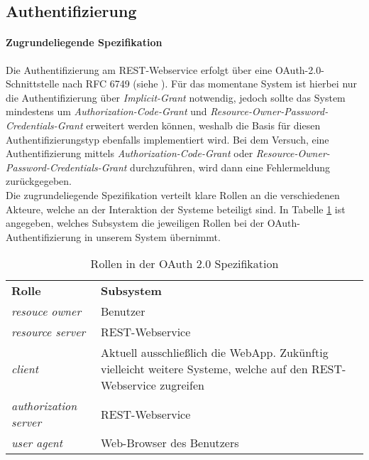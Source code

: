 \FloatBarrier
\subsection{Authentifizierung}
\label{subsec:api-auth}
\paragraph{Zugrundeliegende Spezifikation} Die Authentifizierung am REST-Webservice erfolgt über eine OAuth-2.0-Schnittstelle nach RFC 6749 (siehe \cite{rfc6749}).
Für das momentane System ist hierbei nur die Authentifizierung über \textit{Implicit-Grant} \cite[Kap. 4.2]{rfc6749} notwendig, jedoch sollte das System mindestens um \textit{Authorization-Code-Grant} \cite[Kap. 4.1]{rfc6749} und \textit{Resource-Owner-Password-Credentials-Grant} \cite[Kap. 4.3]{rfc6749} erweitert werden können, weshalb die Basis für diesen Authentifizierungstyp ebenfalls implementiert wird. Bei dem Versuch, eine Authentifizierung mittels \textit{Authorization-Code-Grant} oder \textit{Resource-Owner-Password-Credentials-Grant} durchzuführen, wird dann eine Fehlermeldung zurückgegeben.\\
Die zugrundeliegende Spezifikation verteilt klare Rollen an die verschiedenen Akteure, welche an der Interaktion der Systeme beteiligt sind. In Tabelle \ref{tab:api-auth-roles} ist angegeben, welches Subsystem die jeweiligen Rollen bei der OAuth-Authentifizierung in unserem System übernimmt.

\begin{table}
	\begin{tabular}{@{} | p{} | p{} | @{}} 
		\hline
		\textbf{Rolle} & \textbf{Subsystem}\\ \hhline{|=|=|}
		\textit{resouce owner} & Benutzer \\ \hline
		\textit{resource server} & REST-Webservice \\ \hline
		\textit{client} & Aktuell ausschließlich die WebApp. Zukünftig vielleicht weitere Systeme, welche auf den REST-Webservice zugreifen \\ \hline
		\textit{authorization server} & REST-Webservice \\ \hline
		\textit{user agent} & Web-Browser des Benutzers \\
		\hline
	\end{tabular}
	\caption{Rollen in der OAuth 2.0 Spezifikation}
	\label{tab:api-auth-roles}
\end{table}

